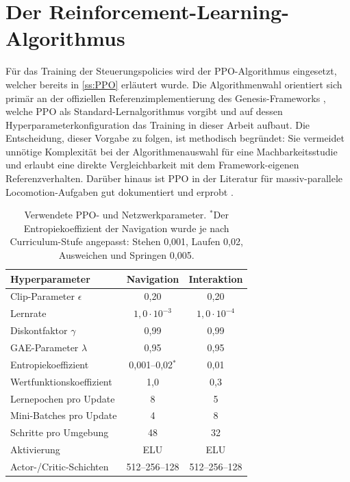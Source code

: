 \section{Der Reinforcement-Learning-Algorithmus}
Für das Training der Steuerungspolicies wird der PPO-Algorithmus eingesetzt, welcher bereits in \autoref{ss:PPO} erläutert wurde. Die Algorithmenwahl orientiert sich primär an der offiziellen Referenzimplementierung des Genesis-Frameworks \cite{authorsGenesisGenerativeUniversal2024}, welche PPO als Standard-Lernalgorithmus vorgibt und auf dessen Hyperparameterkonfiguration das Training in dieser Arbeit aufbaut. Die Entscheidung, dieser Vorgabe zu folgen, ist methodisch begründet: Sie vermeidet unnötige Komplexität bei der Algorithmenauswahl für eine Machbarkeitsstudie und erlaubt eine direkte Vergleichbarkeit mit dem Framework-eigenen Referenzverhalten. Darüber hinaus ist PPO in der Literatur für massiv-parallele Locomotion-Aufgaben gut dokumentiert und erprobt \cite{rudin2022learningwalkminutesusing, schwarke2025rslrllearninglibraryrobotics}.

\begin{table}[htbp]
\centering
\small
\begin{tabular}{lcc}
\toprule
\textbf{Hyperparameter} & \textbf{Navigation} & \textbf{Interaktion} \\
\midrule
Clip-Parameter $\epsilon$ & 0,20 & 0,20 \\
Lernrate & $1{,}0\cdot10^{-3}$ & $1{,}0\cdot10^{-4}$ \\
Diskontfaktor $\gamma$ & 0,99 & 0,99 \\
GAE-Parameter $\lambda$ & 0,95 & 0,95 \\
Entropiekoeffizient & 0,001--0,02$^\ast$ & 0,01 \\
Wertfunktionskoeffizient & 1,0 & 0,3 \\
Lernepochen pro Update & 8 & 5 \\
Mini-Batches pro Update & 4 & 8 \\
Schritte pro Umgebung & 48 & 32 \\
Aktivierung & ELU & ELU \\
Actor-/Critic-Schichten & 512--256--128 & 512--256--128 \\
\bottomrule
\end{tabular}
\caption{Verwendete PPO- und Netzwerkparameter. $^\ast$Der Entropiekoeffizient der Navigation wurde je nach Curriculum-Stufe angepasst: Stehen 0{,}001, Laufen 0{,}02, Ausweichen und Springen 0{,}005.}
\label{tab:ppo_hyperparameters}
\end{table}

